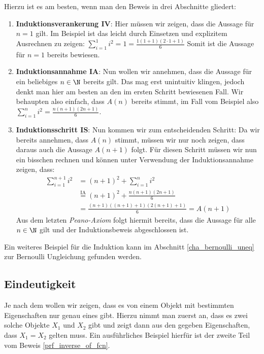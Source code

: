 Hierzu ist es am besten, wenn man den Beweis in drei Abschnitte gliedert:
\begin{enumerate}
    \item \textbf{Induktionsverankerung IV}: Hier müssen wir zeigen, dass die Aussage für $n = 1$ gilt. Im Beispiel ist das leicht durch Einsetzen und explizitem Ausrechnen zu zeigen: $\sum_{i = 1}^1i^2 = 1 = \frac{1(1+1)(2\cdot1+1)}{6}$ Somit ist die Aussage für $n = 1$ bereits bewiesen.
    \item \textbf{Induktionsannahme IA}: Nun wollen wir annehmen, dass die Aussage für ein beliebiges $n \in \N$ bereits gilt. Das mag erst unintuitiv klingen, jedoch denkt man hier am besten an den im ersten Schritt bewiesenen Fall. Wir behaupten also einfach, dass $A(n)$ bereits stimmt, im Fall vom Beispiel also $\sum_{i = 1}^ni^2 = \frac{n(n+1)(2n+1)}{6}$.
    \item \textbf{Induktionsschritt IS}: Nun kommen wir zum entscheidenden Schritt: Da wir bereits annehmen, dass $A(n)$ stimmt, müssen wir nur noch zeigen, dass daraus auch die Aussage $A(n+1)$ folgt. Für diesen Schritt müssen wir nun ein bisschen rechnen und können unter Verwendung der Induktionsannahme zeigen, dass:
    \begin{align*}
        \sum_{i = 1}^{n+1}i^2 &= (n+1)^2 + \sum_{i = 1}^{n}i^2 \\
                            &\stackrel{\text{IA}}{=} (n+1)^2 + \frac{n(n+1)(2n+1)}{6} \\
                            &= \frac{(n+1)((n+1)+1)(2(n+1)+1)}{6} = A(n+1)
    \end{align*}
    Aus dem letzten \textit{Peano-Axiom} folgt hiermit bereits, dass die Aussage für alle $n \in \N$ gilt und der Induktionsbeweis abgeschlossen ist.
\end{enumerate}
Ein weiteres Beispiel für die Induktion kann im Abschnitt \ref{cha_bernoulli_uneq} zur Bernoulli Ungleichung gefunden werden.

\subsection{Eindeutigkeit} Je nach dem wollen wir zeigen, dass es von einem Objekt mit bestimmten Eigenschaften nur genau eines gibt. Hierzu nimmt man zuerst an, dass es zwei solche Objekte $X_1$ und $X_2$ gibt und zeigt dann aus den gegeben Eigenschaften, dass $X_1 = X_2$ gelten muss. Ein ausführliches Beispiel hierfür ist der zweite Teil vom Beweis \ref{prf_inverse_of_fcn}.

